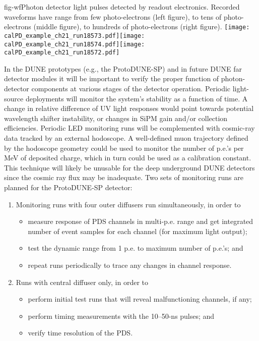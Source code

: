 %
 \begin{cdrfigure}{fig-wf}{Photon detector light pulses detected by readout electronics. Recorded waveforms have range from few photo-electrons (left figure), to tens of photo-electrons (middle figure), to hundreds of photo-electrons (right figure).}
\texttt{[image: calPD\_example\_ch21\_run18573.pdf]}\texttt{[image: calPD\_example\_ch21\_run18574.pdf]}\texttt{[image: calPD\_example\_ch21\_run18572.pdf]}
\end{cdrfigure}
%
In the DUNE prototypes (e.g., the ProtoDUNE-SP) and in future DUNE far detector modules it will be important to 
verify the proper function of photon-detector components
at various stages of the detector operation. 
Periodic light-source deployments will monitor the system's stability as a function of time. A change in relative difference of UV light responses would point towards potential wavelength shifter instability, 
or changes in SiPM gain and/or collection efficiencies. %
Periodic LED monitoring runs will be complemented 
with cosmic-ray data tracked by an external hodoscope. 
A well-defined muon trajectory defined by the hodoscope geometry could be used to monitor the number of p.e.'s per MeV of deposited charge, which in turn 
could be used as a calibration constant. This technique will likely be unusable 
for the deep underground DUNE detectors since the cosmic ray flux may be inadequate. %
	Two sets of monitoring runs are planned for the ProtoDUNE-SP detector: 
\begin{enumerate}
\item Monitoring runs with four outer diffusers run simultaneously, in order to
   \begin{itemize}
   \item measure response of PDS channels in multi-p.e. range and get integrated number of event samples for each channel (for maximum light output);
   \item test  the dynamic range from 1 p.e. to maximum number of p.e.'s; and
   \item repeat runs periodically to trace any changes in channel response.
    \end{itemize}
\item Runs with central diffuser only, in order to
   \begin{itemize}
   \item perform initial test runs that will reveal malfunctioning channels, if any;
   \item perform timing measurements with the 10--50-ns pulses; and
    \item verify time resolution of the PDS.
   \end{itemize}
\end{enumerate}

